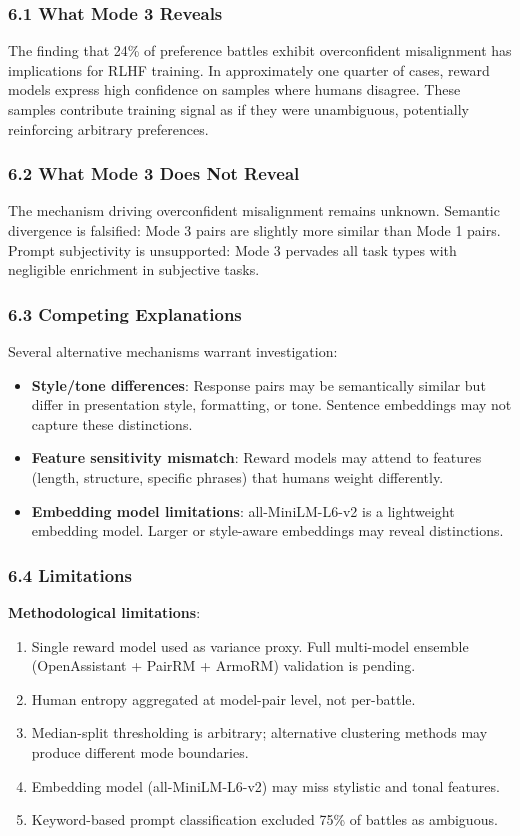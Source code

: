 
\subsubsection{6.1 What Mode 3 Reveals}

The finding that 24\% of preference battles exhibit overconfident misalignment has implications for RLHF training. In approximately one quarter of cases, reward models express high confidence on samples where humans disagree. These samples contribute training signal as if they were unambiguous, potentially reinforcing arbitrary preferences.

\subsubsection{6.2 What Mode 3 Does Not Reveal}

The mechanism driving overconfident misalignment remains unknown. Semantic divergence is falsified: Mode 3 pairs are slightly more similar than Mode 1 pairs. Prompt subjectivity is unsupported: Mode 3 pervades all task types with negligible enrichment in subjective tasks.

\subsubsection{6.3 Competing Explanations}

Several alternative mechanisms warrant investigation:

\begin{itemize}
\item \textbf{Style/tone differences}: Response pairs may be semantically similar but differ in presentation style, formatting, or tone. Sentence embeddings may not capture these distinctions.
\item \textbf{Feature sensitivity mismatch}: Reward models may attend to features (length, structure, specific phrases) that humans weight differently.
\item \textbf{Embedding model limitations}: all-MiniLM-L6-v2 is a lightweight embedding model. Larger or style-aware embeddings may reveal distinctions.
\end{itemize}

\subsubsection{6.4 Limitations}

\textbf{Methodological limitations}:
\begin{enumerate}
\item Single reward model used as variance proxy. Full multi-model ensemble (OpenAssistant + PairRM + ArmoRM) validation is pending.
\item Human entropy aggregated at model-pair level, not per-battle.
\item Median-split thresholding is arbitrary; alternative clustering methods may produce different mode boundaries.
\item Embedding model (all-MiniLM-L6-v2) may miss stylistic and tonal features.
\item Keyword-based prompt classification excluded 75\% of battles as ambiguous.
\end{enumerate}

